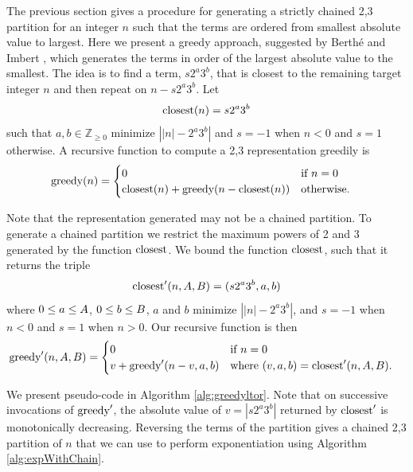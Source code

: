 \documentclass{ucalgthes1}
\theoremstyle{definition}
\newcommand{\ZZgez}{\mathbb{Z}_{\ge 0}}
\begin{document}
The previous section gives a procedure for generating a strictly chained 2,3 partition for an integer $n$ such that the terms are ordered from smallest absolute value to largest.  Here we present a greedy approach, suggested by Berth{\'e} and Imbert \cite{Berthe2009}, which generates the terms in order of the largest absolute value to the smallest. The idea is to find a term, $s2^a3^b$, that is closest to the remaining target integer $n$ and then repeat on $n - s2^a3^b$. Let
\[
\textrm{closest}(n) = s2^a3^b
\]
such that $a,b \in \ZZgez$ minimize $\left| |n| - 2^a3^b \right|$ and $s = -1$ when $n < 0$ and $s = 1$ otherwise. A recursive function to compute a 2,3 representation greedily is
\begin{align*}
\textrm{greedy}(n) &= \begin{cases}
              0 & \textrm{if $n = 0$} \\
              \textrm{closest}(n) + \textrm{greedy}(n - \textrm{closest}(n)) & \textrm{otherwise}.
          \end{cases}
\end{align*}

\noindent
Note that the representation generated may not be a chained partition. To generate a chained partition we restrict the maximum powers of 2 and 3 generated by the function $\textrm{closest}$.  We bound the function $\textrm{closest}$, such that it returns the triple
\[
\textrm{closest}'(n, A, B) = (s2^a3^b, a, b)
\]
where $0 \le a \le A$, $0 \le b \le B$, $a$ and $b$ minimize $\left| |n| - 2^a3^b \right|$, and $s=-1$ when $n < 0$ and $s=1$ when $n > 0$. Our recursive function is then
\begin{align*}
\textrm{greedy}'(n, A, B) &= \begin{cases}
        0 & \textrm{if $n = 0$} \\
        v + \textrm{greedy}'(n - v, a, b) & \textrm{where $(v, a, b) = \textrm{closest}'(n, A, B)$}.
    \end{cases}
\end{align*}

\noindent
We present pseudo-code in Algorithm \ref{alg:greedyltor}. Note that on successive invocations of $\textrm{greedy}'$, the absolute value of $v=|s2^a3^b|$ returned by $\textrm{closest}'$ is monotonically decreasing.  Reversing the terms of the partition gives a chained 2,3 partition of $n$ that we can use to perform exponentiation using Algorithm \ref{alg:expWithChain}.
\end{document}
